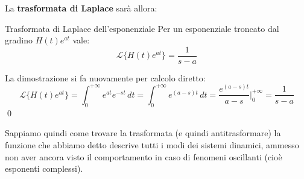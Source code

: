 \documentclass[a4paper,11pt]{article}
\begin{document}
		La \textbf{trasformata di Laplace} sarà allora:
		\begin{theorem}{Trasformata di Laplace dell'esponenziale}
			Per un esponenziale troncato dal gradino $H(t)e^{at}$ vale:
		$$
		\mathcal{L} \{ H(t) e^{at} \} = \frac{1}{s - a}
		$$
		\end{theorem}
		La dimostrazione si fa nuovamente per calcolo diretto:
		$$
		\mathcal{L} \{ H(t) e^{at} \} = \int_0^{+ \infty} e^{at} e^{-st} \, dt = \int_0^{+\infty} e^{(a - s)t} \, dt =  \frac{e^{(a - s)t}}{a - s} \Bigg|^{+\infty}_0 = \frac{1}{s - a}
		$$
		\qed

		Sappiamo quindi come trovare la trasformata (e quindi antitrasformare) la funzione che abbiamo detto descrive tutti i modi dei sistemi dinamici, ammesso non aver ancora visto il comportamento in caso di fenomeni oscillanti (cioè esponenti complessi).
\end{document}
